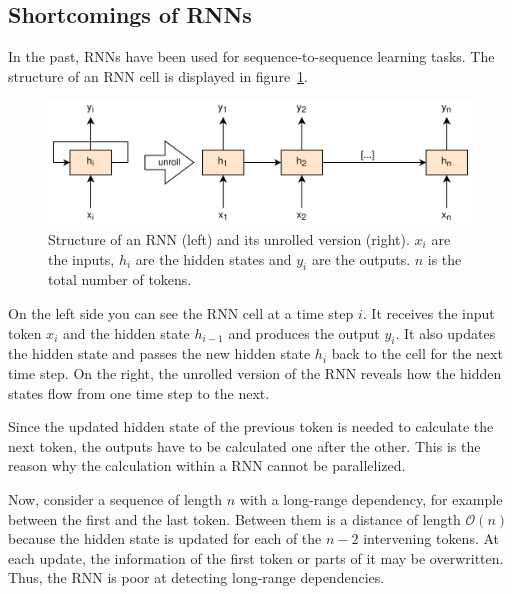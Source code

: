 \documentclass[a4paper]{scrartcl}
\begin{document}
    \subsection{Shortcomings of RNNs}
    In the past, RNNs have been used for sequence-to-sequence learning tasks.
    The structure of an RNN cell is displayed in figure~\ref{fig:rnn-unrolled}.

    \begin{figure}[hbtp]
        \centering
        \includegraphics[width=0.7\linewidth]{img/RnnUnrolled}
        \caption[Unrolled structure of an RNN]{Structure of an RNN (left) and its unrolled version (right).
            $x_i$ are the inputs, $h_i$ are the hidden states and $y_i$ are the outputs.
            $n$ is the total number of tokens.
        }
        \label{fig:rnn-unrolled}
    \end{figure}

    On the left side you can see the RNN cell at a time step $i$.
    It receives the input token $x_i$ and the hidden state $h_{i-1}$ and produces the output $y_i$.
    It also updates the hidden state and passes the new hidden state $h_i$ back to the cell for the next time step.
    On the right, the unrolled version of the RNN reveals how the hidden states flow from one time step to the next.

    Since the updated hidden state of the previous token is needed to calculate the next token, the outputs have to be calculated one after the other.
    This is the reason why the calculation within a RNN cannot be parallelized.

    Now, consider a sequence of length $n$ with a long-range dependency, for example between the first and the last token.
    Between them is a distance of length $\mathcal{O}(n)$ because the hidden state is updated for each of the $n - 2$ intervening tokens.
    At each update, the information of the first token or parts of it may be overwritten.
    Thus, the RNN is poor at detecting long-range dependencies.
\end{document}
